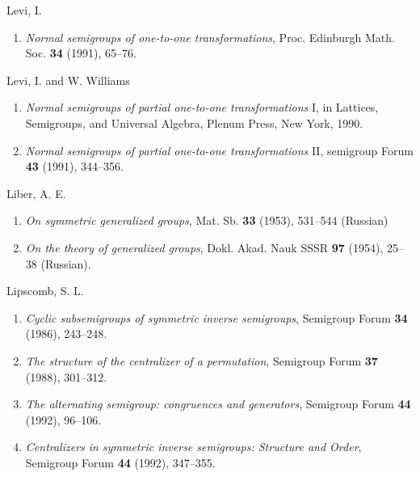 \documentclass{surv-l}
\numberwithin{equation}{section}
\numberwithin{table}{section}
\numberwithin{figure}{section}
\theoremstyle{plain}
\theoremstyle{definition}
\begin{document}
\begin{thebibliography}{}
\item[] Levi, I.
\begin{enumerate}
\item \label{bib40} \emph{Normal semigroups of one-to-one
transformations}, Proc. Edinburgh Math. Soc. \textbf{34}
(1991), 65--76.
\end{enumerate}

\item[] Levi, I. and W. Williams
\begin{enumerate}
\item \label{bib41} \emph{Normal semigroups of partial one-to-one
transformations} I, in Lattices, Semigroups, and Universal
Algebra, Plenum Press, New York, 1990.

\item \label{bib41a} \emph{Normal semigroups of partial one-to-one
transformations} II, semigroup Forum \textbf{43} (1991),
344--356.
\end{enumerate}

\item[] Liber, A. E.
\begin{enumerate}
\item \label{bib42} \emph{On symmetric generalized groups}, Mat. Sb. \textbf{33}
(1953), 531--544 (Russian)

\item \label{bib42a} \emph{On the theory of generalized groups}, Dokl.
Akad. Nauk SSSR \textbf{97} (1954), 25--38 (Russian).
\end{enumerate}

\item[] Lipscomb, S. L.
\begin{enumerate}
\item \label{bib43} \emph{Cyclic subsemigroups of symmetric inverse
semigroups}, Semigroup Forum \textbf{34} (1986), 243--248.

\item \label{bib43a} \emph{The structure of
the centralizer of a permutation}, Semigroup Forum \textbf{37}
(1988), 301--312.

\item \label{bib43b} \emph{The alternating semigroup: congruences and
generators}, Semigroup Forum \textbf{44} (1992), 96--106.

\item \label{bib43c} \emph{Centralizers in symmetric inverse semigroups:
Structure and Order}, Semigroup Forum \textbf{44} (1992),
347--355.


\end{enumerate}
\end{thebibliography}
\end{document}
